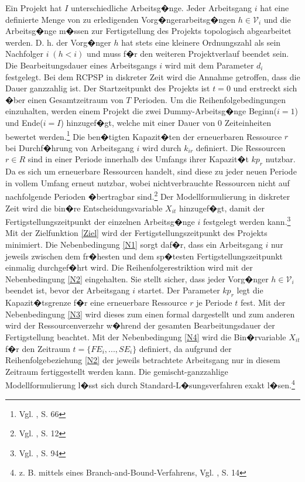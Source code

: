 \documentclass[a4paper,12pt,parskip,bibtotoc,liststotoc]{article}
\begin{document}
Ein Projekt hat $I$ unterschiedliche Arbeitsg�nge. Jeder Arbeitsgang $i$ hat eine definierte Menge von zu erledigenden Vorg�ngerarbeitsg�ngen $h \in \mathcal{V}_{i}$ und die Arbeitsg�nge m�ssen zur Fertigstellung des Projekts topologisch abgearbeitet werden. D. h. der Vorg�nger $h$ hat stets eine kleinere Ordnungszahl als sein Nachfolger $i\;(h<i)$ und muss f�r den weiteren Projektverlauf beendet sein. Die Bearbeitungsdauer eines Arbeitsgangs $i$ wird mit dem Parameter $d_{i}$ festgelegt.  Bei dem RCPSP in diskreter Zeit wird die Annahme getroffen, dass die Dauer ganzzahlig ist. Der Startzeitpunkt des Projekts ist $t = 0$ und erstreckt sich �ber einen Gesamtzeitraum von $T$ Perioden. Um die Reihenfolgebedingungen einzuhalten, werden einem Projekt die zwei Dummy-Arbeitsg�nge \glqq Beginn\grqq\;($i=1$) und \glqq Ende\grqq\;($i=I$) hinzugef�gt, welche mit einer Dauer von $0$ Zeiteinheiten bewertet werden.\footnote{Vgl. \cite{zimmermann2006projektplanung}, S. 66} Die ben�tigten Kapazit�ten der erneuerbaren Ressource $r$ bei Durchf�hrung von Arbeitsgang $i$ wird durch $k_{ir}$ definiert. Die Ressourcen $r \in R$ sind in einer Periode innerhalb des Umfangs ihrer Kapazit�t $kp_{r}$ nutzbar. Da es sich um erneuerbare Ressourcen handelt, sind diese zu jeder neuen Periode in vollem Umfang erneut nutzbar, wobei nichtverbrauchte Ressourcen nicht auf nachfolgende Perioden �bertragbar sind.\footnote{Vgl. \cite{kellenbrink2014einfuhrung}, S. 12} Der Modellformulierung in diskreter Zeit wird die bin�re Entscheidungsvariable $X_{it}$ hinzugef�gt, damit der Fertigstellungszeitpunkt der einzelnen Arbeitsg�nge $i$ festgelegt werden kann.\footnote{Vgl. \cite{pritsker1969multiproject}, S. 94} \\%

Mit der Zielfunktion \eqref{Ziel} wird der Fertigstellungszeitpunkt des Projekts minimiert. Die Nebenbedingung \eqref{N1} sorgt daf�r, dass ein Arbeitsgang $i$ nur jeweils zwischen dem fr�hesten und dem sp�testen Fertigstellungszeitpunkt einmalig durchgef�hrt wird. Die Reihenfolgerestriktion wird mit der Nebenbedingung \eqref{N2} eingehalten. Sie stellt sicher, dass jeder Vorg�nger $h \in \mathcal{V}_{i}$ beendet ist, bevor der Arbeitsgang $i$ startet.
Der Parameter $kp_{r}$ legt die Kapazit�tsgrenze f�r eine erneuerbare Ressource $r$ je Periode $t$ fest. Mit der Nebenbedingung \eqref{N3} wird dieses zum einen formal dargestellt und zum anderen wird der Ressourcenverzehr w�hrend der gesamten Bearbeitungsdauer der Fertigstellung beachtet.
Mit der Nebenbedingung \eqref{N4} wird die Bin�rvariable $X_{it}$ f�r den Zeitraum $t = \{FE_{i},...,SE_{i}\}$ definiert, da aufgrund der Reihenfolgebeziehung \eqref{N2} der jeweils betrachtete Arbeitsgang nur in diesem Zeitraum fertiggestellt werden kann. Die gemischt-ganzzahlige Modellformulierung l�sst sich durch Standard-L�sungsverfahren exakt l�sen.\footnote{z. B. mittels eines Branch-and-Bound-Verfahrens, Vgl. \cite{kellenbrink2014einfuhrung}, S. 14}
\end{document}
